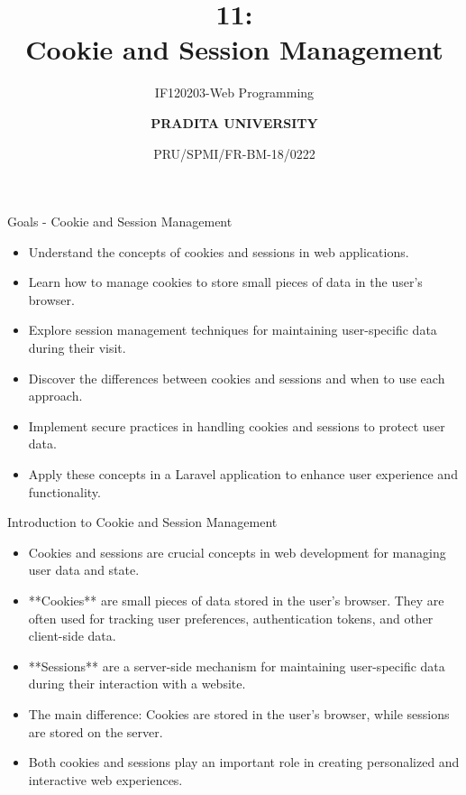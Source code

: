 \documentclass[aspectratio=169, table]{beamer}
\subtitle{IF120203-Web Programming}
\title{\Huge {\textbf{11: \\Cookie and Session Management}}}
\date[Serial]{\scriptsize {PRU/SPMI/FR-BM-18/0222}}
\author[Pradita]{\small {\textbf{PRADITA UNIVERSITY}}}
\begin{document}
\begin{frame}
    \titlepage
\end{frame}

\begin{frame}{Goals - Cookie and Session Management}
\vskip1cm
    \begin{itemize}
        \item Understand the concepts of cookies and sessions in web applications.
        \item Learn how to manage cookies to store small pieces of data in the user's browser.
        \item Explore session management techniques for maintaining user-specific data during their visit.
        \item Discover the differences between cookies and sessions and when to use each approach.
        \item Implement secure practices in handling cookies and sessions to protect user data.
        \item Apply these concepts in a Laravel application to enhance user experience and functionality.
    \end{itemize}
\end{frame}

\begin{frame}{Introduction to Cookie and Session Management}
    \vskip1cm
    \begin{itemize}
        \item Cookies and sessions are crucial concepts in web development for managing user data and state.
        \item **Cookies** are small pieces of data stored in the user's browser. They are often used for tracking user preferences, authentication tokens, and other client-side data.
        \item **Sessions** are a server-side mechanism for maintaining user-specific data during their interaction with a website.
        \item The main difference: Cookies are stored in the user's browser, while sessions are stored on the server.
        \item Both cookies and sessions play an important role in creating personalized and interactive web experiences.
    \end{itemize}
\end{frame}
\end{document}

